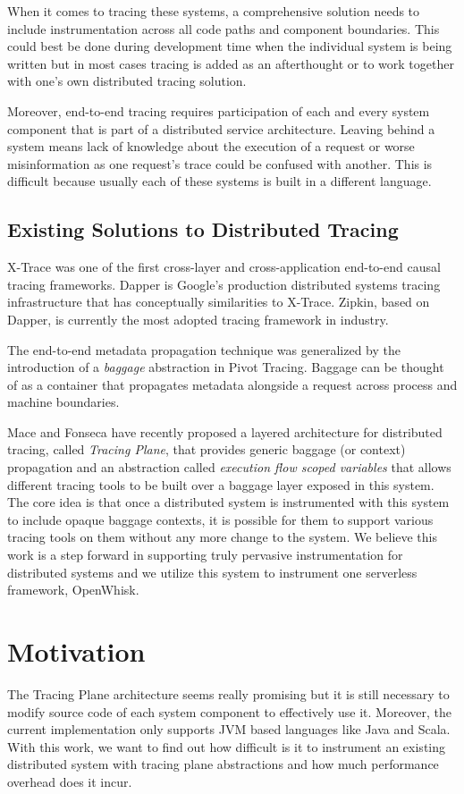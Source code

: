 When it comes to tracing these systems, a comprehensive solution needs to include instrumentation across all code paths and component boundaries. This could best be done during development time when the individual system is being written but in most cases tracing is added as an afterthought or to work together with one's own distributed tracing solution.

Moreover, end-to-end tracing requires participation of each and every system component that is part of a distributed service architecture. Leaving behind a system means lack of knowledge about the execution of a request or worse misinformation as one request's trace could be confused with another. This is difficult because usually each of these systems is built in a different language.

\subsection{Existing Solutions to Distributed Tracing}
X-Trace\cite{Fonseca:2007:XPN:1973430.1973450} was one of the first cross-layer and cross-application end-to-end causal tracing frameworks. Dapper\cite{36356} is Google's production distributed systems tracing infrastructure that has conceptually similarities to X-Trace. Zipkin\cite{web:zipkin}, based on Dapper, is currently the most adopted tracing framework in industry\cite{mace2017survey}.

The end-to-end metadata propagation technique was generalized by the introduction of a \emph{baggage} abstraction in Pivot Tracing\cite{Mace:2015:PTD:2815400.2815415}. Baggage can be thought of as a container that propagates metadata alongside a request across process and machine boundaries.

Mace and Fonseca have recently proposed a layered architecture\cite{Mace17}\cite{Fonseca16} for distributed tracing, called \emph{Tracing Plane}, that provides generic baggage (or context) propagation and an abstraction called \emph{execution flow scoped variables} that allows different tracing tools to be built over a baggage layer exposed in this system. The core idea is that once a distributed system is instrumented with this system to include opaque baggage contexts, it is possible for them to support various tracing tools on them without any more change to the system. We believe this work is a step forward in supporting truly pervasive instrumentation for distributed systems and we utilize this system to instrument one serverless framework, OpenWhisk.


\section{Motivation}

The Tracing Plane architecture seems really promising but it is still necessary to modify source code of each system component to effectively use it. Moreover, the current implementation only supports JVM based languages like Java and Scala. With this work, we want to find out how difficult is it to instrument an existing distributed system with tracing plane abstractions and how much performance overhead does it incur.
